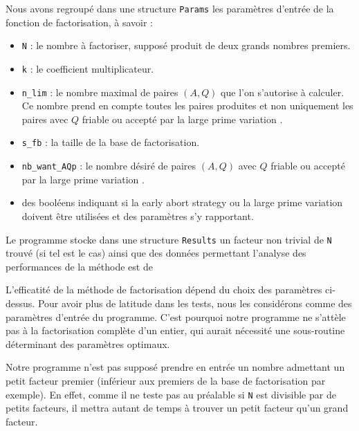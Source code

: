 Nous avons regroupé dans une structure \texttt{Params} les paramètres d'entrée 
de la fonction de factorisation, à savoir :

\begin{itemize}
    \item \texttt{N} : le nombre à factoriser, supposé produit de deux grands
                       nombres premiers.
    \item \texttt{k} : le coefficient multiplicateur.
    \item \texttt{n\_lim} : le nombre maximal de paires $(A,Q)$ que l'on 
                             s'autorise à calculer. Ce nombre prend en compte
                             toutes les paires produites et non uniquement les
                             paires avec $Q$ friable ou accepté par la \og large
                             prime variation \fg{}.
    \item \texttt{s\_fb} : la taille de la base de factorisation. 
    \item \texttt{nb\_want\_AQp} : le nombre désiré de paires $(A,Q)$ avec $Q$ 
                                 friable ou accepté par la \og large prime 
                                 variation \fg{}.
    \item des booléens indiquant si la \og early abort strategy \fg{} ou la 
          \og large prime variation \fg{} doivent être utilisées et des paramètres s'y rapportant.

\end{itemize}

Le programme stocke dans une structure \texttt{Results} un facteur non trivial
de \texttt{N} trouvé (si tel est le cas) ainsi que des données permettant 
l'analyse des performances de la méthode est de 

\begin{remarque}
L'efficatité de la méthode de factorisation dépend du choix des paramètres
ci-dessus. Pour avoir plus de latitude dans les tests, nous les considérons 
comme des paramètres d'entrée du programme. C'est pourquoi notre programme
ne s'attèle pas à la factorisation complète d'un entier, qui aurait nécessité
une sous-routine déterminant des paramètres optimaux. 
   
\end{remarque}

\begin{remarque}
Notre programme n'est pas supposé prendre en entrée un nombre admettant un petit
facteur premier (inférieur aux premiers de la base de factorisation par exemple).
En effet, comme il ne teste pas au préalable si \texttt{N} est divisible par de 
petits facteurs, il mettra autant de temps à trouver un petit facteur qu'un
grand facteur.
\end{remarque}

